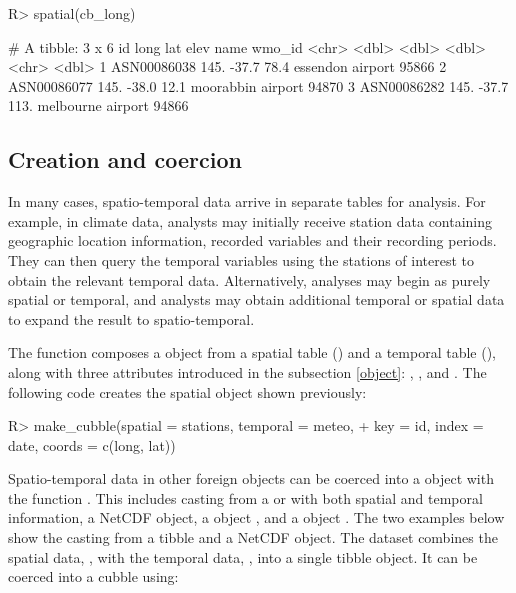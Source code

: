 \documentclass[
  shortnames]{jss}
\begin{document}
\begin{CodeChunk}
\begin{CodeInput}
R> spatial(cb_long)
\end{CodeInput}
\begin{CodeOutput}
# A tibble: 3 x 6
  id           long   lat  elev name              wmo_id
  <chr>       <dbl> <dbl> <dbl> <chr>              <dbl>
1 ASN00086038  145. -37.7  78.4 essendon airport   95866
2 ASN00086077  145. -38.0  12.1 moorabbin airport  94870
3 ASN00086282  145. -37.7 113.  melbourne airport  94866
\end{CodeOutput}
\end{CodeChunk}

\hypertarget{create}{%
\subsection{Creation and coercion}\label{create}}

In many cases, spatio-temporal data arrive in separate tables for analysis. For example, in climate data, analysts may initially receive station data containing geographic location information, recorded variables and their recording periods. They can then query the temporal variables using the stations of interest to obtain the relevant temporal data. Alternatively, analyses may begin as purely spatial or temporal, and analysts may obtain additional temporal or spatial data to expand the result to spatio-temporal.

The function  composes a  object from a spatial table () and a temporal table (), along with three attributes introduced in the subsection \ref{object}: , , and . The following code creates the spatial  object shown previously:

\begin{CodeChunk}
\begin{CodeInput}
R> make_cubble(spatial = stations, temporal = meteo,
+             key = id, index = date, coords = c(long, lat))
\end{CodeInput}
\end{CodeChunk}

Spatio-temporal data in other foreign objects can be coerced into a  object with the function . This includes casting from a  or  with both spatial and temporal information, a NetCDF object, a  object \citep{stars}, and a  object \citep{sftime}. The two examples below show the casting from a tibble and a NetCDF object. The dataset  combines the spatial data, , with the temporal data, , into a single tibble object. It can be coerced into a cubble using:
\end{document}
